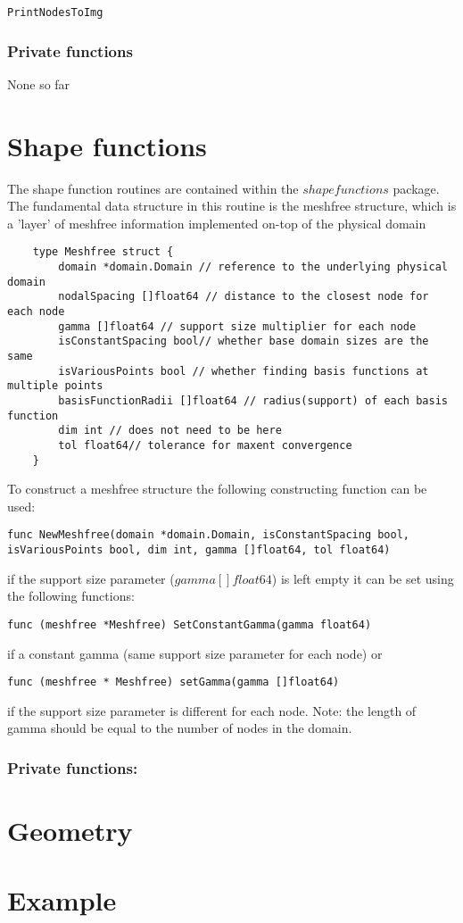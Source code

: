 \begin{lstlisting}
PrintNodesToImg
\end{lstlisting}

\subsubsection*{Private functions}
None so far

\pagebreak
\section{Shape functions}
The shape function routines are contained within the $shapefunctions$ package. The fundamental data structure in this routine is the meshfree structure, which is a 'layer' of meshfree information implemented on-top of the physical domain

\begin{tcolorbox}
	\begin{lstlisting}
	type Meshfree struct {	
		domain *domain.Domain // reference to the underlying physical domain
		nodalSpacing []float64 // distance to the closest node for each node 
		gamma []float64 // support size multiplier for each node
		isConstantSpacing bool// whether base domain sizes are the same
		isVariousPoints bool // whether finding basis functions at multiple points
		basisFunctionRadii []float64 // radius(support) of each basis function
		dim int // does not need to be here
		tol float64// tolerance for maxent convergence
	}
	\end{lstlisting}
\end{tcolorbox}
\noindent To construct a meshfree structure the following constructing function can be used:
\begin{lstlisting}
func NewMeshfree(domain *domain.Domain, isConstantSpacing bool, isVariousPoints bool, dim int, gamma []float64, tol float64)
\end{lstlisting}
if the support size parameter ($gamma []float64$) is left empty it can be set using the following functions:
\begin{lstlisting}
func (meshfree *Meshfree) SetConstantGamma(gamma float64)
\end{lstlisting}
if a constant gamma (same support size parameter for each node)
or 
\begin{lstlisting}
func (meshfree * Meshfree) setGamma(gamma []float64)
\end{lstlisting}
if the support size parameter is different for each node. Note: the length of gamma should be equal to the number of nodes in the domain. 


\subsubsection*{Private functions:}
\section{Geometry}


\section{Example}


